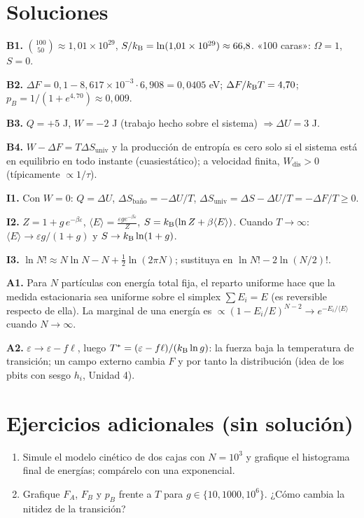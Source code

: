 \documentclass[11pt,a4paper]{article}
\begin{document}
\section{Soluciones}
\begin{solucion}
\textbf{B1.} $\binom{100}{50}\approx1{,}01\times10^{29}$, $S/k_{\mathrm B}=\ln(1{,}01\times10^{29})\approx66{,}8$. «100 caras»: $\Omega=1$, $S=0$.

\textbf{B2.} $\Delta F=0{,}1-8{,}617\times10^{-3}\cdot6{,}908=0{,}0405$ eV; $\Delta F/k_{\mathrm B} T=4{,}70$; $p_B=1/(1+e^{4{,}70})\approx0{,}009$.

\textbf{B3.} $Q=+5$ J, $W=-2$ J (trabajo hecho sobre el sistema) $\Rightarrow\Delta U=3$ J.

\textbf{B4.} $W-\Delta F=T\Delta S_{\text{univ}}$ y la producción de entropía es cero solo si el sistema está en equilibrio en todo instante (cuasiestático); a velocidad finita, $W_{\text{dis}}>0$ (típicamente $\propto1/\tau$).

\textbf{I1.} Con $W=0$: $Q=\Delta U$, $\Delta S_{\text{baño}}=-\Delta U/T$, $\Delta S_{\text{univ}}=\Delta S-\Delta U/T=-\Delta F/T\ge0$.

\textbf{I2.} $Z=1+g\,e^{-\beta\varepsilon}$, $\langle E\rangle=\frac{\varepsilon g e^{-\beta\varepsilon}}{Z}$, $S=k_{\mathrm B}(\ln Z+\beta\langle E\rangle)$. Cuando $T\to\infty$: $\langle E\rangle\to\varepsilon g/(1+g)$ y $S\to k_{\mathrm B}\ln(1+g)$.

\textbf{I3.} $\ln N!\approx N\ln N-N+\frac12\ln(2\pi N)$; sustituya en $\ln N!-2\ln(N/2)!$.

\textbf{A1.} Para $N$ partículas con energía total fija, el reparto uniforme hace que la medida estacionaria sea uniforme sobre el simplex $\sum E_i=E$ (es reversible respecto de ella). La marginal de una energía es $\propto(1-E_i/E)^{N-2}\to e^{-E_i/\langle E\rangle}$ cuando $N\to\infty$.

\textbf{A2.} $\varepsilon\to\varepsilon-f\ell$, luego $T^*=(\varepsilon-f\ell)/(k_{\mathrm B}\ln g)$: la fuerza baja la temperatura de transición; un campo externo cambia $F$ y por tanto la distribución (idea de los pbits con sesgo $h_i$, Unidad 4).
\end{solucion}

\section{Ejercicios adicionales (sin solución)}
\begin{enumerate}[label=\textbf{P\arabic*.}]
\item Simule el modelo cinético de dos cajas con $N=10^3$ y grafique el histograma final de energías; compárelo con una exponencial.
\item Grafique $F_A$, $F_B$ y $p_B$ frente a $T$ para $g\in\{10,1000,10^6\}$. ¿Cómo cambia la nitidez de la transición?
\end{enumerate}
\end{document}
